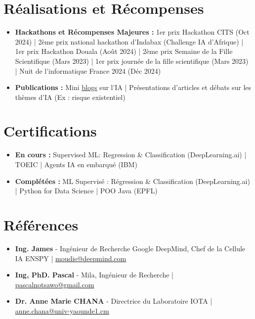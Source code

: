\documentclass[a4paper,11pt]{article}
\newcommand{\resumeItemListStart}{\begin{itemize}[leftmargin=0.12in, label={\tiny$\bullet$}, itemsep=1pt, parsep=0pt, topsep=0pt]}
\newcommand{\resumeItemListEnd}{\end{itemize}\vspace{-3pt}}
\begin{document}
\section{Réalisations et Récompenses}
\resumeItemListStart
\item \textbf{Hackathons et Récompenses Majeures :} 1er prix Hackathon CITS (Oct 2024) | 2ème prix national hackathon d'Indabax (Challenge IA d'Afrique) | 1er prix Hackathon Douala (Août 2024) | 2ème prix Semaine de la Fille Scientifique (Mars 2023) | 1er prix journée de la fille scientifique (Mars 2023) | Nuit de l'informatique France 2024 (Déc 2024)
\item \textbf{Publications :} Mini \href{https://mbassiloic.tech/#blog}{\uline{blogs}} sur l'IA | Présentations d'articles et débats sur les thèmes d'IA (Ex : risque existentiel)
\resumeItemListEnd

\section{Certifications}
\resumeItemListStart
\item \textbf{En cours :} Supervised ML: Regression \& Classification (DeepLearning.ai) | TOEIC | Agents IA en embarqué (IBM)
\item \textbf{Complétées :} ML Supervisé : Régression \& Classification (DeepLearning.ai) | Python for Data Science | POO Java (EPFL)
\resumeItemListEnd

\section{Références}
\resumeItemListStart
\item \textbf{Ing. James} - Ingénieur de Recherche Google DeepMind, Chef de la Cellule IA ENSPY | \href{mailto:moudie@deepmind.com}{\uline{moudie@deepmind.com}}
\item \textbf{Ing, PhD. Pascal} - Mila, Ingénieur de Recherche | \href{mailto:pascalnotsawo@gmail.com}{\uline{pascalnotsawo@gmail.com}}
\item \textbf{Dr. Anne Marie CHANA} - Directrice du Laboratoire IOTA | \href{mailto:anne.chana@univ-yaounde1.cm}{\uline{anne.chana@univ-yaounde1.cm}}
\resumeItemListEnd
\end{document}
